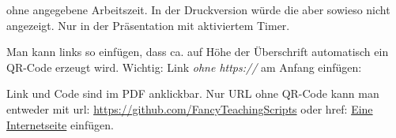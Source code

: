 {
        ohne angegebene Arbeitszeit. In der Druckversion würde die aber sowieso nicht angezeigt. Nur in der Präsentation mit aktiviertem Timer.

    Man kann links so einfügen, dass ca. auf Höhe der Überschrift automatisch ein QR-Code erzeugt wird. Wichtig: Link \emph{ohne https://} am Anfang einfügen: 
    
    Link und Code sind im PDF anklickbar. Nur URL ohne QR-Code kann man entweder mit url: \url{https://github.com/FancyTeachingScripts} oder href: \href{https://valentin-herrmann.com/}{Eine Internetseite} einfügen.

}